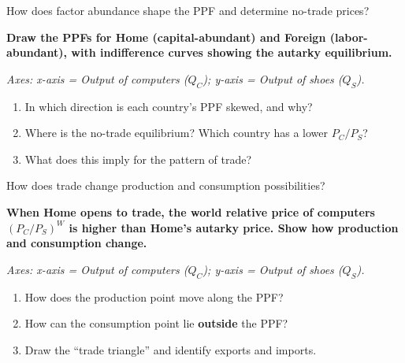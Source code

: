 \documentclass{beamer}
\begin{document}
\begin{frame}{How does factor abundance shape the PPF and determine no-trade prices?}

\textbf{Draw the PPFs for Home (capital-abundant) and Foreign (labor-abundant), with indifference curves showing the autarky equilibrium.}

\vspace{0.2cm}

\textit{Axes: x-axis = Output of computers ($Q_C$); y-axis = Output of shoes ($Q_S$).}

\vspace{0.3cm}

\begin{enumerate}
    \item In which direction is each country's PPF skewed, and why?
    \item Where is the no-trade equilibrium? Which country has a lower $P_C/P_S$?
    \item What does this imply for the pattern of trade?
\end{enumerate}

\end{frame}


\begin{frame}{How does trade change production and consumption possibilities?}

\textbf{When Home opens to trade, the world relative price of computers $(P_C/P_S)^W$ is higher than Home's autarky price. Show how production and consumption change.}

\vspace{0.2cm}

\textit{Axes: x-axis = Output of computers ($Q_C$); y-axis = Output of shoes ($Q_S$).}

\vspace{0.3cm}

\begin{enumerate}
    \item How does the production point move along the PPF?
    \item How can the consumption point lie \textbf{outside} the PPF?
    \item Draw the ``trade triangle'' and identify exports and imports.
\end{enumerate}

\end{frame}
\end{document}
